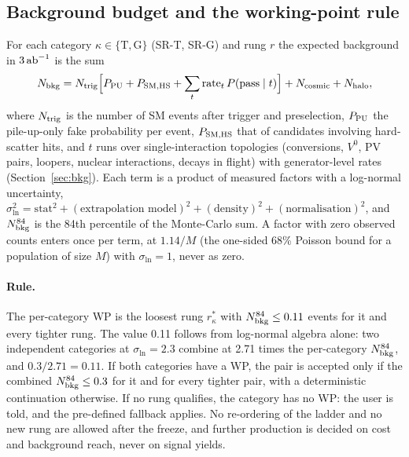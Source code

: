 \subsection{Background budget and the working-point rule}\label{sec:strategy:rule}
For each category $\kappa\in\{\text{T},\text{G}\}$ (SR-T, SR-G) and rung $r$ the expected background in $3\,\mathrm{ab}^{-1}$ is the sum
\begin{equation}
  N_{\rm bkg} = N_{\rm trig}\Big[P_{\rm PU}+P_{\rm SM,HS}+\sum_t \text{rate}_t\,P(\text{pass}\mid t)\Big]+N_{\rm cosmic}+N_{\rm halo},
  \label{eq:bsum}
\end{equation}
where $N_{\rm trig}$ is the number of SM events after trigger and preselection, $P_{\rm PU}$ the pile-up-only fake probability
per event, $P_{\rm SM,HS}$ that of candidates involving hard-scatter hits, and $t$ runs over single-interaction
topologies (conversions, $V^0$, PV pairs, loopers, nuclear interactions, decays in flight) with generator-level rates
(Section~\ref{sec:bkg}). Each term is a product of measured factors with a log-normal uncertainty,
$\sigma_{\ln}^2=\text{stat}^2+(\text{extrapolation model})^2+(\text{density})^2+(\text{normalisation})^2$, and
$N_{\rm bkg}^{84}$ is the 84th percentile of the Monte-Carlo sum. A factor with zero observed counts enters once per term,
at $1.14/M$ (the one-sided 68\% Poisson bound for a population of size $M$) with $\sigma_{\ln}=1$, never as zero.

\paragraph{Rule.} The per-category WP is the loosest rung $r^*_\kappa$ with $N_{\rm bkg}^{84}\le0.11$ events for it and every
tighter rung. The value 0.11 follows from log-normal algebra alone: two independent categories at $\sigma_{\ln}=2.3$
combine at 2.71 times the per-category $N_{\rm bkg}^{84}$, and $0.3/2.71=0.11$. If both categories have a WP, the pair is
accepted only if the combined $N_{\rm bkg}^{84}\le0.3$ for it and for every tighter pair, with a deterministic continuation
otherwise. If no rung qualifies, the category has no WP: the user is told, and the pre-defined fallback applies. No
re-ordering of the ladder and no new rung are allowed after the freeze, and further production is decided on cost and
background reach, never on signal yields.

